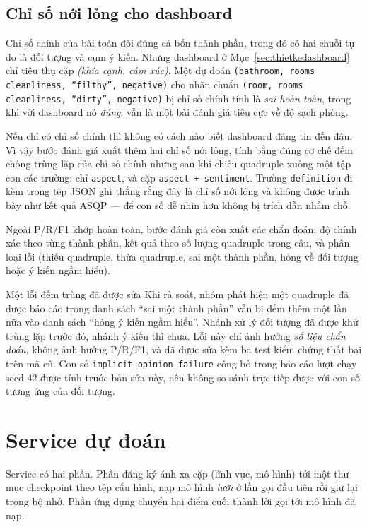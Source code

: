 \documentclass[12pt,a4paper]{report}
\newcommand{\enquote}[1]{“#1”}
\newcommand{\code}[1]{\texttt{#1}}
\begin{document}
\subsection{Chỉ số nới lỏng cho dashboard}
\label{sec:relaxed}

Chỉ số chính của bài toán đòi đúng cả bốn thành phần, trong đó có hai chuỗi tự do là đối tượng và cụm ý kiến. Nhưng
dashboard ở Mục~\ref{sec:thietkedashboard} chỉ tiêu thụ cặp \emph{(khía cạnh, cảm xúc)}. Một dự đoán
\code{(bathroom, rooms cleanliness, \enquote{filthy}, negative)} cho nhãn chuẩn
\code{(room, rooms cleanliness, \enquote{dirty}, negative)} bị chỉ số chính tính là \emph{sai hoàn toàn}, trong khi với
dashboard nó \emph{đúng}: vẫn là một bài đánh giá tiêu cực về độ sạch phòng.

Nếu chỉ có chỉ số chính thì không có cách nào biết dashboard đáng tin đến đâu. Vì vậy bước đánh giá xuất thêm hai chỉ số
nới lỏng, tính bằng đúng cơ chế đếm chống trùng lặp của chỉ số chính nhưng sau khi chiếu quadruple xuống một tập con
các trường: chỉ \code{aspect}, và cặp \code{aspect + sentiment}. Trường \code{definition} đi kèm trong tệp JSON ghi
thẳng rằng đây là chỉ số nới lỏng và không được trình bày như kết quả ASQP --- để con số dễ nhìn hơn không bị trích dẫn
nhầm chỗ.

Ngoài P/R/F1 khớp hoàn toàn, bước đánh giá còn xuất các chẩn đoán: độ chính xác theo từng thành phần, kết quả theo số
lượng quadruple trong câu, và phân loại lỗi (thiếu quadruple, thừa quadruple, sai một thành phần, hỏng về đối tượng hoặc
ý kiến ngầm hiểu).

\begin{ghichu}{Một lỗi đếm trùng đã được sửa}
Khi rà soát, nhóm phát hiện một quadruple đã được báo cáo trong danh sách \enquote{sai một thành phần} vẫn bị đếm thêm
một lần nữa vào danh sách \enquote{hỏng ý kiến ngầm hiểu}. Nhánh xử lý đối tượng đã được khử trùng lặp trước đó, nhánh
ý kiến thì chưa. Lỗi này chỉ ảnh hưởng \emph{số liệu chẩn đoán}, không ảnh hưởng P/R/F1, và đã được sửa kèm ba test
kiểm chứng thất bại trên mã cũ. Con số \code{implicit\_opinion\_failure} công bố trong báo cáo lượt chạy seed 42 được
tính trước bản sửa này, nên không so sánh trực tiếp được với con số tương ứng của đối tượng.
\end{ghichu}

\section{Service dự đoán}

Service có hai phần. Phần đăng ký ánh xạ cặp (lĩnh vực, mô hình) tới một thư mục checkpoint theo tệp cấu hình, nạp mô
hình \emph{lười} ở lần gọi đầu tiên rồi giữ lại trong bộ nhớ. Phần ứng dụng chuyển hai điểm cuối thành lời gọi tới mô
hình đã nạp.
\end{document}
